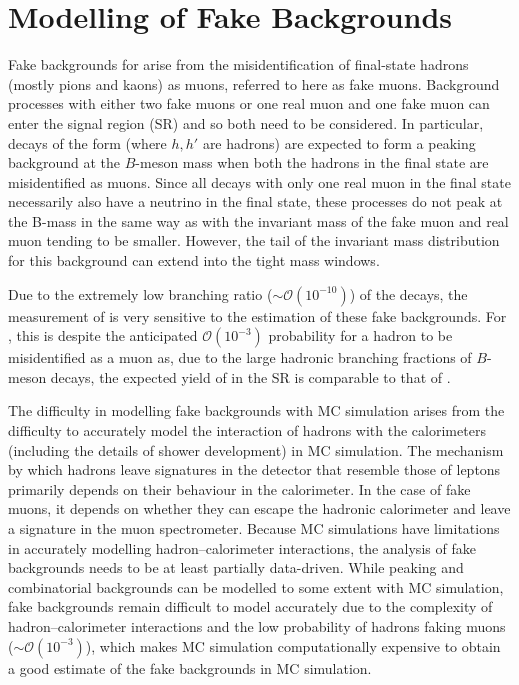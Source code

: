 \section{Modelling of Fake Backgrounds}
\label{sec:FakeBackground}
Fake backgrounds for \Bmumu arise from the misidentification of final-state hadrons (mostly pions and kaons) as muons, referred to here as fake muons. %
Background processes with either two fake muons or one real muon and one fake muon can enter the signal region (SR) and so both need to be considered. 
In particular, decays of the form \Bhh (where $h,h'$ are hadrons) are expected to form a peaking background at the $B$-meson mass when both the hadrons in the final state are misidentified as muons. %
Since all decays with only one real muon in the final state necessarily also have a neutrino in the final state, these processes do not peak at the B-mass in the same way as \Bhh with the invariant mass of the fake muon and real muon tending to be smaller. 
However, the tail of the invariant mass distribution for this background can extend into the tight \Bds mass windows.  

Due to the extremely low branching ratio (\(\sim \mathcal{O}(10^{-10})\)) of the \Bmumu decays, the measurement of \BRBmumu is very sensitive to the estimation of these fake backgrounds.
For \Bhh, this is despite the anticipated $\mathcal{O}(10^{-3})$ probability for a hadron to be misidentified as a muon as, due to the large hadronic branching fractions of $B$-meson decays, the expected yield of \Bhh in the SR is comparable to that of \Bdmumu. 

The difficulty in modelling fake backgrounds with MC simulation arises from the difficulty to accurately model the interaction of hadrons with the calorimeters (including the details of shower development) in MC simulation.
The mechanism by which hadrons leave signatures in the detector that resemble those of leptons primarily depends on their behaviour in the calorimeter. 
In the case of fake muons, it depends on whether they can escape the hadronic calorimeter and leave a signature in the muon spectrometer. Because MC simulations have limitations in accurately modelling hadron–calorimeter interactions, the analysis of fake backgrounds needs to be at least partially data-driven. 
While peaking and combinatorial backgrounds can be modelled to some extent with MC simulation, fake backgrounds remain difficult to model accurately due to the complexity of hadron–calorimeter interactions and the low probability of hadrons faking muons (\(\sim \mathcal{O}(10^{-3})\)), which makes MC simulation computationally expensive to obtain a good estimate of the fake backgrounds in MC simulation.

